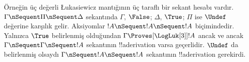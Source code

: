 \documentclass[../../../include/open-logic-section]{subfiles}
\begin{document}
Örneğin üç değerli Łukasiewicz mantığının üç taraflı bir sekant hesabı
vardır. $\Gamma\nSequent\Pi\nSequent\Delta$ sekantında $\Gamma$, $\False$;
$\Delta$, $\True$; $\Pi$ ise $\Undef$ değerine karşılık gelir. Aksiyomlar
$!A\nSequent !A\nSequent !A$ biçimindedir. Yalnızca $\True$ belirlenmiş
olduğundan $\Gamma\Proves[\LogLuk[3]]!A$ ancak ve ancak
$\Gamma\nSequent\Gamma\nSequent !A$ sekantının !!a{derivation} varsa
geçerlidir. $\Undef$ da belirlenmiş olsaydı
$\Gamma\nSequent !A\nSequent !A$ sekantının !!a{derivation} gerekirdi.
\end{document}
